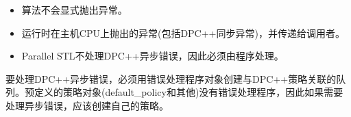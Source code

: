\begin{itemize}
	\item 算法不会显式抛出异常。
	\item 运行时在主机CPU上抛出的异常(包括DPC++同步异常)，并传递给调用者。
	\item Parallel STL不处理DPC++异步错误，因此必须由程序处理。
\end{itemize}

要处理DPC++异步错误，必须用错误处理程序对象创建与DPC++策略关联的队列。预定义的策略对象(default\_policy和其他)没有错误处理程序，因此如果需要处理异步错误，应该创建自己的策略。\par

































